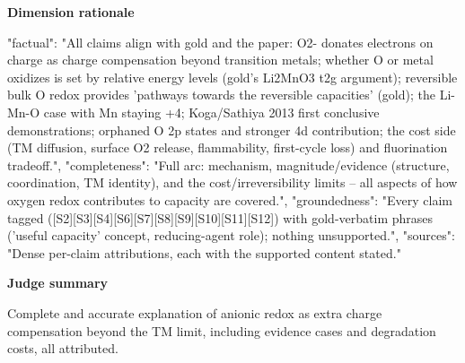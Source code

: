 \documentclass[10pt]{article}
\begin{document}
\textbf{Dimension rationale}
\begin{EvidenceText}
{
  "factual": "All claims align with gold and the paper: O2- donates electrons on charge as charge compensation beyond transition metals; whether O or metal oxidizes is set by relative energy levels (gold's Li2MnO3 t2g argument); reversible bulk O redox provides 'pathways towards the reversible capacities' (gold); the Li-Mn-O case with Mn staying +4; Koga/Sathiya 2013 first conclusive demonstrations; orphaned O 2p states and stronger 4d contribution; the cost side (TM diffusion, surface O2 release, flammability, first-cycle loss) and fluorination tradeoff.",
  "completeness": "Full arc: mechanism, magnitude/evidence (structure, coordination, TM identity), and the cost/irreversibility limits -- all aspects of how oxygen redox contributes to capacity are covered.",
  "groundedness": "Every claim tagged ([S2][S3][S4][S6][S7][S8][S9][S10][S11][S12]) with gold-verbatim phrases ('useful capacity' concept, reducing-agent role); nothing unsupported.",
  "sources": "Dense per-claim attributions, each with the supported content stated."
}
\end{EvidenceText}

\textbf{Judge summary}
\begin{EvidenceText}
Complete and accurate explanation of anionic redox as extra charge compensation beyond the TM limit, including evidence cases and degradation costs, all attributed.
\end{EvidenceText}
\end{document}
